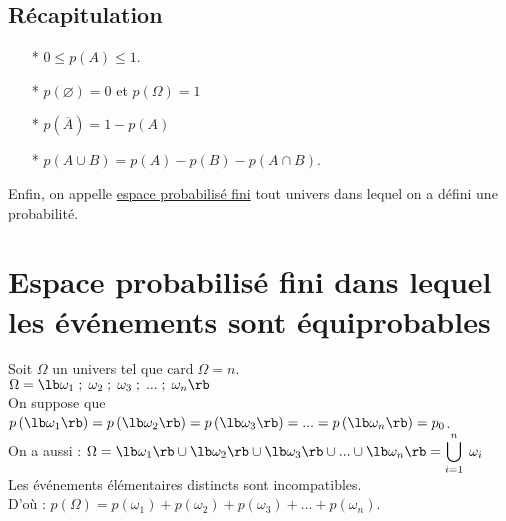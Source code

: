 \subsection{Récapitulation}

\begin{itemize}
\item[*]$0 \leqslant p\left(A\right) \leqslant 1$. \\
\item[*] $p\left( \varnothing\right) = 0 $ et $ p\left(\Omega\right) = 1$ \\
\item[*] $p\left(\overline{A}\right) = 1 - p\left(A\right) $ \\
\item[*] $p\left( A \cup B \right) = p \left(A \right) - p \left(B \right) - p\left(A \cap B\right) $. \\
\end{itemize}

\vspace*{.3cm}

Enfin, on appelle \underline{espace probabilisé fini} tout univers dans lequel on a défini une probabilité.

\newpage

\section{Espace probabilisé fini dans lequel les événements sont équiprobables}

Soit $\Omega$ un univers tel que $\mathrm{card} \; \Omega = n$. \\
 
$\Omega = \lb \omega_1 \; ; \; \omega_2 \; ; \; \omega_3 \; ; \;  ... \; ; \; \omega_n \rb $ \\
 
On suppose que $p\left( \lb \omega_1 \rb \right) = p\left( \lb \omega_2 \rb \right) = p\left( \lb \omega_3 \rb \right) = ... = p\left( \lb \omega_n \rb \right) = p_0 $. \\
 
On a aussi : $\Omega = \lb \omega_1 \rb \cup \lb \omega_2 \rb \cup \lb \omega_3 \rb \cup ... \cup \lb \omega_n \rb = \displaystyle\bigcup_{i=1}^n \; \omega_i$ \\
 
Les événements élémentaires distincts sont incompatibles. \\ D'où : $p\left(\Omega\right) = p\left(\omega_1\right) + p\left(\omega_2\right) + p\left(\omega_3\right) + ... + p\left(\omega_n\right)$. \\

